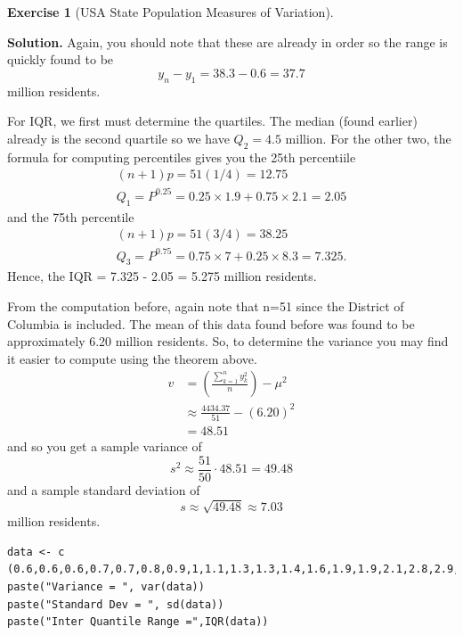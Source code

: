 \documentclass[10pt,]{book}
\theoremstyle{plain}
\theoremstyle{definition}
\theoremstyle{definition}
\theoremstyle{definition}
\newtheorem{exercise}[theorem]{Exercise}
\numberwithin{equation}{section}
\begin{document}
\begin{exercise}[{USA State Population Measures of Variation}]\label{exercise-1}
\par\smallskip
\noindent\textbf{Solution.}\hypertarget{solution-2}{}\quad
Again, you should note that these are already in order so the range is quickly found to be 
	\begin{equation*}y_n - y_1 = 38.3 - 0.6 = 37.7\end{equation*} 
	million residents.
\par

	For IQR, we first must determine the quartiles. The median (found earlier) already is the second quartile so we have \(Q_2 = 4.5\) million. For the other two, the formula for computing percentiles gives you the 25th percentiile
	\begin{gather*}
(n+1)p = 51(1/4) = 12.75\\
Q_1 = P^{0.25} = 0.25 \times 1.9 + 0.75 \times 2.1 = 2.05
\end{gather*}
	and the 75th percentile
	\begin{gather*}
(n+1)p = 51(3/4) = 38.25\\
Q_3 = P^{0.75} = 0.75 \times 7 + 0.25 \times 8.3 = 7.325.
\end{gather*}
	Hence, the IQR = 7.325 - 2.05 = 5.275 million residents.
\par

	From the computation before, again note that n=51 since the District of Columbia is included. The mean of this data found before was found to be approximately 6.20 million residents. So, to determine the variance you may find it easier to compute using the theorem above. 
	\begin{align*}
 v & = \left ( \frac{\sum_{k=1}^n y_k^2 }{n} \right ) - \mu^2
	\\
 & \approx \frac{4434.37}{51} - (6.20)^2
	\\
 & = 48.51
	
\end{align*}
	and so you get a sample variance of
	\begin{equation*} s^2 \approx \frac{51}{50} \cdot 48.51 = 49.48\end{equation*}
	and a sample standard deviation of
	\begin{equation*}s \approx \sqrt{49.48} \approx 7.03\end{equation*} million residents.
\end{exercise}
\begin{lstlisting}[style=sageinput]
data <- c (0.6,0.6,0.6,0.7,0.7,0.8,0.9,1,1.1,1.3,1.3,1.4,1.6,1.9,1.9,2.1,2.8,2.9,2.9,3,3,3.1,3.6,3.9,3.9,4.4,4.6,4.8,4.8,5.3,5.4,5.7,5.9,6,6.5,6.6,6.6,6.7,7,8.3,8.9,9.8,9.9,10,11.6,12.8,12.9,19.6,19.7,26.4,38.3)
paste("Variance = ", var(data))
paste("Standard Dev = ", sd(data))
paste("Inter Quantile Range =",IQR(data))
\end{lstlisting}
\typeout{************************************************}
\typeout{************************************************}
\end{document}
